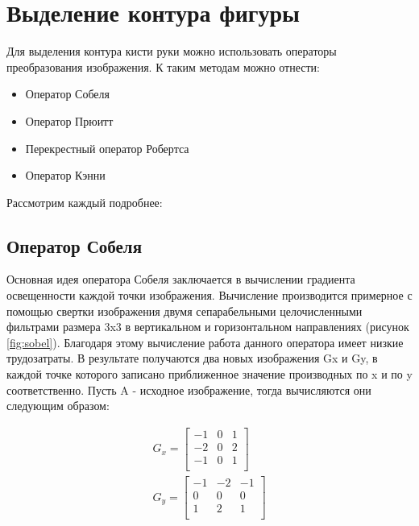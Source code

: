 \section{Выделение контура фигуры}
\label{sec:Edge}

Для выделения контура кисти руки можно использовать операторы преобразования изображения. К таким методам можно отнести:

\begin{itemize}
	\item Оператор Собеля
	\item Оператор Прюитт
	\item Перекрестный оператор Робертса
	\item Оператор Кэнни
\end{itemize}

Рассмотрим каждый подробнее:

\subsection{Оператор Собеля}

Основная идея оператора Собеля\cite{Sobel} заключается в вычислении градиента освещенности каждой точки изображения. Вычисление производится примерное с помощью свертки изображения двумя сепарабельными целочисленными фильтрами размера 3x3 в вертикальном и горизонтальном направлениях (рисунок \ref{fig:sobel}). Благодаря этому вычисление работа данного оператора имеет низкие трудозатраты. В результате получаются два новых изображения Gx и Gy, в каждой точке которого записано приближенное значение производных по x и по y соответственно. Пусть A - исходное изображение, тогда вычисляются они следующим образом:

\begin{eqnarray}\label{eq:sobel-matrixs}
G_x = \begin{bmatrix}
-1 & 0 & 1\\
-2 & 0 & 2\\
-1 & 0 & 1\\
\end{bmatrix} \\
G_y = \begin{bmatrix}
-1 & -2 & -1\\
0 & 0 & 0\\
1 & 2 & 1\\
\end{bmatrix}
\end{eqnarray}

